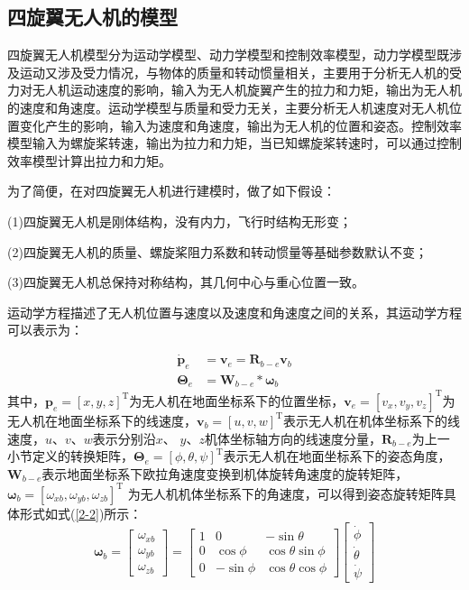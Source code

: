 \documentclass[lang=chs, degree=master, blindreview=false, winfonts=true]{yanputhesis}
\begin{document}
\subsection{四旋翼无人机的模型}
四旋翼无人机模型分为运动学模型、动力学模型和控制效率模型，动力学模型既涉及运动又涉及受力情况，与物体的质量和转动惯量相关，主要用于分析无人机的受力对无人机运动速度的影响，输入为无人机旋翼产生的拉力和力矩，输出为无人机的速度和角速度。运动学模型与质量和受力无关，主要分析无人机速度对无人机位置变化产生的影响，输入为速度和角速度，输出为无人机的位置和姿态。控制效率模型输入为螺旋桨转速，输出为拉力和力矩，当已知螺旋桨转速时，可以通过控制效率模型计算出拉力和力矩。

为了简便，在对四旋翼无人机进行建模时，做了如下假设：

(1)四旋翼无人机是刚体结构，没有内力，飞行时结构无形变；

(2)四旋翼无人机的质量、螺旋桨阻力系数和转动惯量等基础参数默认不变；

(3)四旋翼无人机总保持对称结构，其几何中心与重心位置一致。



运动学方程描述了无人机位置与速度以及速度和角速度之间的关系，其运动学方程可以表示为：

\begin{equation}
    \begin{aligned}
	\dot{\boldsymbol{p}}_e &= \boldsymbol{v}_e = \bm{R}_{b-e} \bm{v}_b \\
	\bm{\Theta}_e &= \bm{W}_{b-e} * \bm{\omega}_b
\end{aligned}\label{2-1}
\end{equation}
其中，$\boldsymbol{p}_e=\left[x,y,z\right]^\mathrm{T}$为无人机在地面坐标系下的位置坐标，$\boldsymbol{v}_e=\left[v_{x},v_{y},v_{z}\right]^\mathrm{T}$为无人机在地面坐标系下的线速度，$\boldsymbol{v}_b=\left[u,v,w\right]^\mathrm{T}$表示无人机在机体坐标系下的线速度，$u$、$v$、$w$表示分别沿$x$、
$y$、$z$机体坐标轴方向的线速度分量，$\boldsymbol{R}_{b-e}$为上一小节定义的转换矩阵，$\bm{\Theta}_e=\left[\phi,\theta,\psi\right]^\mathrm{T}$表示无人机在地面坐标系下的姿态角度，$\bm{W}_{b-e}$表示地面坐标系下欧拉角速度变换到机体旋转角速度的旋转矩阵，$\boldsymbol{\omega}_b=\left[{\omega}_{xb},{\omega}_{yb},{\omega}_{zb}\right]^\mathrm{T}$ 为无人机机体坐标系下的角速度，可以得到姿态旋转矩阵具体形式如式(\ref{2-2})所示：
\begin{equation}
	\boldsymbol{\omega}_b=\begin{bmatrix}\omega_{xb}\\\omega_{yb}\\\omega_{zb}\end{bmatrix}=\begin{bmatrix}1&0&-\sin\theta\\0&\cos\phi&\cos\theta\sin\phi\\0&-\sin\phi&\cos\theta\cos\phi\end{bmatrix}\begin{bmatrix}\dot\phi\\\dot\theta\\\dot\psi\end{bmatrix}
	\label{2-2}
\end{equation}
\end{document}
